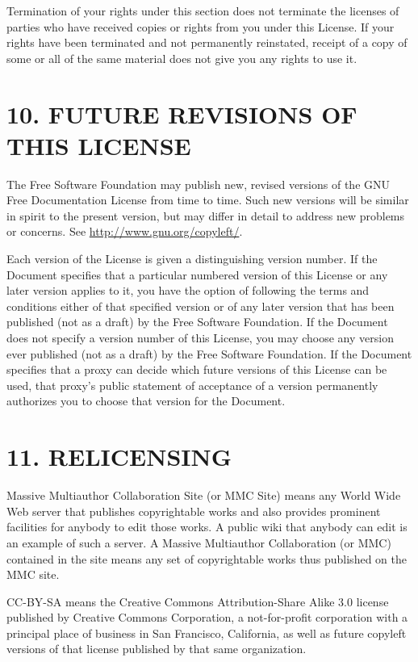 \documentclass[captions=tableheading]{scrbook}
\begin{document}
Termination of your rights under this section does not terminate the licenses of parties who have received copies or rights from you under this License. If your rights have been terminated and not permanently reinstated, receipt of a copy of some or all of the same material does not give you any rights to use it.
\section{10. FUTURE REVISIONS OF THIS LICENSE}
\label{sec-3-11}


The Free Software Foundation may publish new, revised versions of the GNU Free Documentation License from time to time. Such new versions will be similar in spirit to the present version, but may differ in detail to address new problems or concerns. See \href{http://www.gnu.org/copyleft/}{http://www.gnu.org/copyleft/}.

Each version of the License is given a distinguishing version number. If the Document specifies that a particular numbered version of this License or any later version applies to it, you have the option of following the terms and conditions either of that specified version or of any later version that has been published (not as a draft) by the Free Software Foundation. If the Document does not specify a version number of this License, you may choose any version ever published (not as a draft) by the Free Software Foundation. If the Document specifies that a proxy can decide which future versions of this License can be used, that proxy's public statement of acceptance of a version permanently authorizes you to choose that version for the Document.
\section{11. RELICENSING}
\label{sec-3-12}


Massive Multiauthor Collaboration Site (or MMC Site) means any World Wide Web server that publishes copyrightable works and also provides prominent facilities for anybody to edit those works. A public wiki that anybody can edit is an example of such a server. A Massive Multiauthor Collaboration (or MMC) contained in the site means any set of copyrightable works thus published on the MMC site.

CC-BY-SA means the Creative Commons Attribution-Share Alike 3.0 license published by Creative Commons Corporation, a not-for-profit corporation with a principal place of business in San Francisco, California, as well as future copyleft versions of that license published by that same organization.
\end{document}
